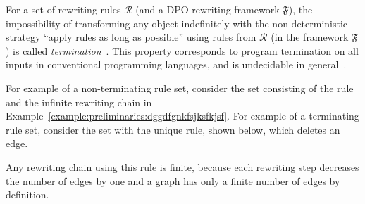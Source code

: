 For a set of rewriting rules \(\mathcal{R}\) (and a DPO rewriting framework \(\mathfrak{F}\)), the impossibility of transforming any object indefinitely with the non-deterministic strategy \enquote{apply rules as long as possible} using rules from \(\mathcal{R}\) (in the framework \(\mathfrak{F}\)) is called \emph{termination}~\cite{middeldorp1997simple}. This property corresponds to program termination on all inputs in conventional programming languages, and is undecidable in general~\cite{plump1998terminationundecidable}.

For example of a non-terminating rule set, consider the set consisting of the rule and the infinite rewriting chain in Example~\ref{example:preliminaries:dggdfgnkfsjksfkjsf}.
For example of a terminating rule set, consider the set with the unique rule, shown below,
which deletes an edge. 
    \begin{center}
            \end{center}
Any rewriting chain using this rule is finite, because each rewriting step decreases the number of edges by one and a graph has only a finite number of edges by definition.


